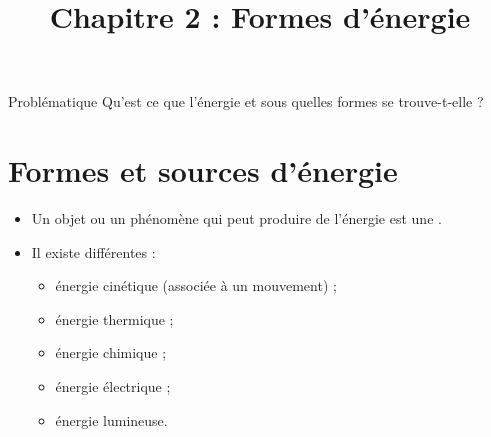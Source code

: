 \documentclass[xcolor={dvipsnames}]{beamer}
\title{Chapitre 2 : Formes d'énergie}
\begin{document}
\begin{frame}
  \titlepage 
\end{frame}


\begin{frame}
\begin{block}{Problématique}
	{\Large Qu'est ce que l'énergie et sous quelles formes se trouve-t-elle ?}
\end{block}
\end{frame}


\section{Formes et sources d'énergie}




\begin{frame}
	

	\begin{mybilan}
		\begin{itemize}
			
			\item Un objet ou un phénomène qui peut produire de l'énergie est une .
			
			\item Il existe différentes  :
			
			\begin{itemize}
				\item énergie cinétique (associée à un mouvement) ;
				\item énergie thermique ;
				\item énergie chimique ;
				\item énergie électrique ;
				\item énergie lumineuse.
			\end{itemize}
		\end{itemize}
	\end{mybilan}

\end{frame}
\end{document}
